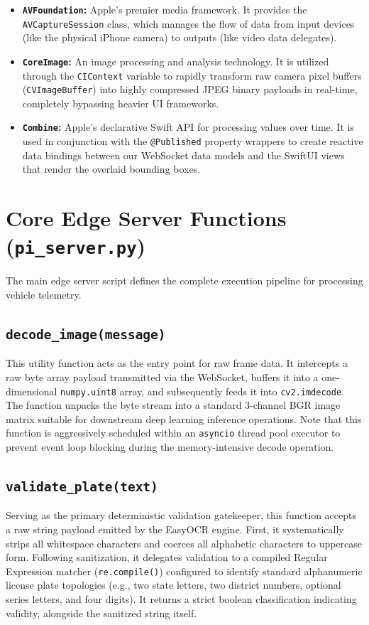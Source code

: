 \begin{itemize}
    \item \textbf{\texttt{AVFoundation}:} Apple's premier media framework. It provides the \texttt{AVCaptureSession} class, which manages the flow of data from input devices (like the physical iPhone camera) to outputs (like video data delegates).
    \item \textbf{\texttt{CoreImage}:} An image processing and analysis technology. It is utilized through the \texttt{CIContext} variable to rapidly transform raw camera pixel buffers (\texttt{CVImageBuffer}) into highly compressed JPEG binary payloads in real-time, completely bypassing heavier UI frameworks.
    \item \textbf{\texttt{Combine}:} Apple's declarative Swift API for processing values over time. It is used in conjunction with the \texttt{@Published} property wrappers to create reactive data bindings between our WebSocket data models and the SwiftUI views that render the overlaid bounding boxes.
\end{itemize}

\section{Core Edge Server Functions (\texttt{pi\_server.py})}

The main edge server script defines the complete execution pipeline for processing vehicle telemetry. 

\subsection{\texttt{decode\_image(message)}}
This utility function acts as the entry point for raw frame data. It intercepts a raw byte array payload transmitted via the WebSocket, buffers it into a one-dimensional \texttt{numpy.uint8} array, and subsequently feeds it into \texttt{cv2.imdecode}. The function unpacks the byte stream into a standard 3-channel BGR image matrix suitable for downstream deep learning inference operations. Note that this function is aggressively scheduled within an \texttt{asyncio} thread pool executor to prevent event loop blocking during the memory-intensive decode operation.

\subsection{\texttt{validate\_plate(text)}}
Serving as the primary deterministic validation gatekeeper, this function accepts a raw string payload emitted by the EasyOCR engine. First, it systematically strips all whitespace characters and coerces all alphabetic characters to uppercase form. Following sanitization, it delegates validation to a compiled Regular Expression matcher (\texttt{re.compile()}) configured to identify standard alphanumeric license plate topologies (e.g., two state letters, two district numbers, optional series letters, and four digits). It returns a strict boolean classification indicating validity, alongside the sanitized string itself.

